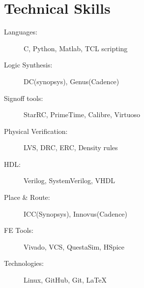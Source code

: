 \documentclass{ExpressiveResume}
\begin{document}

\section{Technical Skills}
	\begin{multicols}{2}
	\noindent
	\begin{description}
		\item[Languages:] C, Python, Matlab, TCL scripting
		\item[Logic Synthesis:] DC(synopsys), Genus(Cadence)
		\item[Signoff tools:] StarRC, PrimeTime, Calibre, Virtuoso
		\item[Physical Verification:] LVS, DRC, ERC, Density rules
		\item[HDL:] Verilog, SystemVerilog, VHDL
		\item[Place \& Route:] ICC(Synopsys), Innovus(Cadence)
		\item[FE Tools:] Vivado, VCS, QuestaSim, HSpice
		\item[Technologies:] Linux, GitHub, Git, \LaTeX\
	\end{description}
\end{multicols}	
\end{document}

